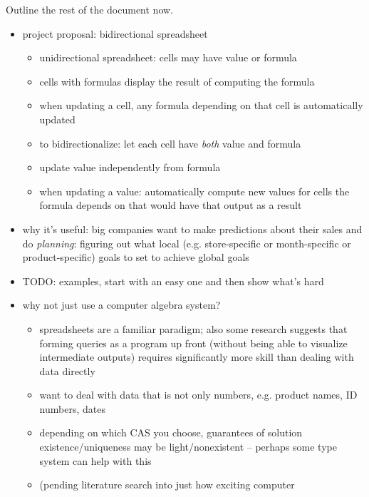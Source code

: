 \documentclass{article}
\begin{document}
Outline the rest of the document now.
\begin{itemize}
    \item project proposal: bidirectional spreadsheet
        \begin{itemize}
            \item unidirectional spreadsheet: cells may have value or
                formula
            \item cells with formulas display the result of computing the
                formula
            \item when updating a cell, any formula depending on that cell
                is automatically updated
            \item to bidirectionalize: let each cell have \emph{both} value
                and formula
            \item update value independently from formula
            \item when updating a value: automatically compute new values
                for cells the formula depends on that would have that output
                as a result
        \end{itemize}
    \item why it's useful: big companies want to make predictions about
        their sales and do \emph{planning}: figuring out what local (e.g.
        store-specific or month-specific or product-specific) goals to set
        to achieve global goals
    \item TODO: examples, start with an easy one and then show what's hard
    \item why not just use a computer algebra system?
        \begin{itemize}
            \item spreadsheets are a familiar paradigm; also some research
                suggests that forming queries as a program up front (without
                being able to visualize intermediate outputs) requires
                significantly more skill than dealing with data directly
            \item want to deal with data that is not only numbers, e.g.
                product names, ID numbers, dates
            \item depending on which CAS you choose, guarantees of solution
                existence/uniqueness may be light/nonexistent -- perhaps
                some type system can help with this
            \item (pending literature search into just how exciting computer

\end{itemize}
\end{itemize}
\end{document}
